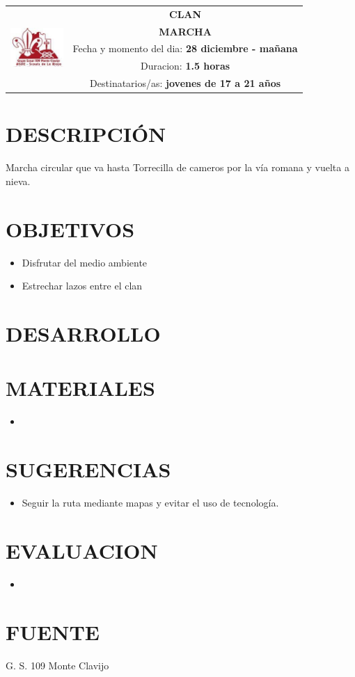 \documentclass[72pt]{article}
\newlength{\w}
\begin{document}
\large
{}\selectfont
\begin{tabular}{|p{2cm}|c|}
\hline
\multirow{5}{*}{\includegraphics[width=2cm]{logo}} & \textbf{CLAN} \\ %
\cline{2-2}
& \textbf{MARCHA} \\ %
\cline{2-2}
& \parbox{\textwidth-4cm}{Fecha y momento del dia: \textbf{28 diciembre - mañana}} \\ %
& \parbox{\textwidth-4cm}{Duracion: \textbf{1.5 horas}} \\ %
& \parbox{\textwidth-4cm}{Destinatarios/as: \textbf{jovenes de 17 a 21 años}} \\ %
\hline
\end{tabular}

\section*{DESCRIPCI\'ON} 
Marcha circular que va hasta Torrecilla de cameros por la vía romana y
vuelta a nieva.

\section*{OBJETIVOS}
\begin{itemize}
    \item Disfrutar del medio ambiente
    \item Estrechar lazos entre el clan
\end{itemize}

\section*{DESARROLLO}
 
\section*{MATERIALES}
\begin{itemize}
    \item
\end{itemize}
\section*{SUGERENCIAS}

\begin{itemize}
    \item Seguir la ruta mediante mapas y evitar el uso de tecnología.
\end{itemize}

 \section*{EVALUACION}
\begin{itemize}
    \item
\end{itemize}

\section*{FUENTE}
G. S. 109 Monte Clavijo
\end{document}

